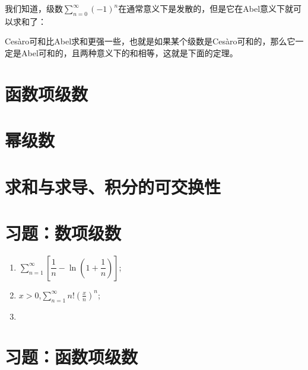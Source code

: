     我们知道，级数\(\sum\limits_{n=0}^{\infty}(-1)^n\)在通常意义下是发散的，但是它在Abel意义下就可以求和了：
    \begin{definition}

    \end{definition}
    Ces\`{a}ro可和比Abel求和更强一些，也就是如果某个级数是Ces\`{a}ro可和的，那么它一定是Abel可和的，且两种意义下的和相等，这就是下面的定理。
    \begin{theorem}
        
    \end{theorem}
\section{函数项级数}
\section{幂级数}
\section{求和与求导、积分的可交换性}
\section{习题：数项级数}
\begin{exercise}[判断下列正项级数的敛散性]
    \begin{enumerate}
        \item \(\displaystyle\sum\limits_{n=1}^{\infty}\left[\dfrac{1}{n}-\ln(1+\dfrac{1}{n})\right]\);
        \item \(x>0\),\enspace  \(\displaystyle\sum\limits_{n=1}^{\infty}n!(\frac{x}{n})^n\);
        \item 
    \end{enumerate}
\end{exercise}
\section{习题：函数项级数}